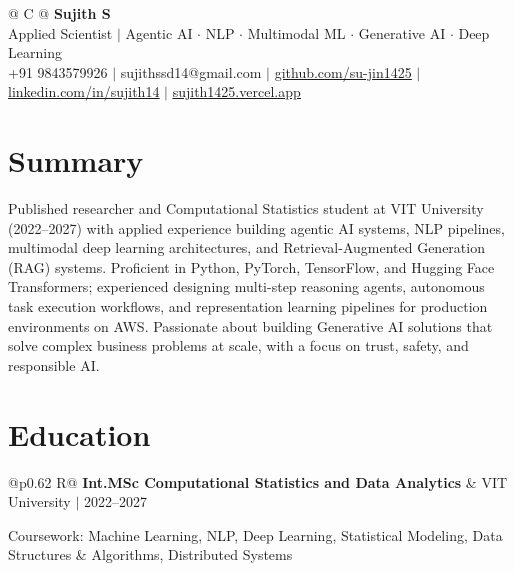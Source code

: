 \documentclass[a4paper,10pt]{article}
\newcommand{\ulink}[2]{\href{#1}{\uline{#2}}}
\newcommand{\subheading}[1]{{\color[HTML]{0A0A0A}\fontsize{12}{14}\selectfont\bfseries #1}}
\newcommand{\meta}[1]{{\color[HTML]{5C5C5C}\fontsize{10.5}{12.5}\selectfont #1}}
\begin{document}
\pagestyle{empty}

\begin{tabularx}{\linewidth}{@{} C @{}}
{\color[HTML]{000000}\fontsize{30}{35}\selectfont\bfseries Sujith S} \\[5pt]
{\fontsize{10.5}{12.5}\selectfont\color[HTML]{3A3A3A}
Applied Scientist $|$ Agentic AI $\cdot$ NLP $\cdot$ Multimodal ML $\cdot$ Generative AI $\cdot$ Deep Learning} \\[6pt]
{\fontsize{10.5}{12.5}\selectfont\textcolor[HTML]{3A3A3A}{
+91 9843579926 $|$
sujithssd14@gmail.com $|$
\ulink{https://github.com/su-jin1425}{github.com/su-jin1425} $|$
\ulink{https://linkedin.com/in/sujith14}{linkedin.com/in/sujith14} $|$
\ulink{https://sujith1425.vercel.app}{sujith1425.vercel.app}}}
\end{tabularx}

\vspace{2pt}

\section{Summary}
\vspace{5pt}
{\color[HTML]{0A0A0A}\fontsize{11}{14}\selectfont
Published researcher and Computational Statistics student at VIT University (2022--2027) with applied experience building agentic AI systems, NLP pipelines, multimodal deep learning architectures, and Retrieval-Augmented Generation (RAG) systems. Proficient in Python, PyTorch, TensorFlow, and Hugging Face Transformers; experienced designing multi-step reasoning agents, autonomous task execution workflows, and representation learning pipelines for production environments on AWS. Passionate about building Generative AI solutions that solve complex business problems at scale, with a focus on trust, safety, and responsible AI.}

\vspace{2pt}

\section{Education}
\vspace{2pt}

\begin{tabularx}{\linewidth}{@{}p{0.62\linewidth} R@{}}
\subheading{Int.MSc Computational Statistics and Data Analytics} & \meta{VIT University $|$ 2022--2027}
\end{tabularx}
\vspace{1pt}
{\color[HTML]{3A3A3A}\fontsize{11}{14}\selectfont Coursework: Machine Learning, NLP, Deep Learning, Statistical Modeling, Data Structures \& Algorithms, Distributed Systems}
\end{document}
